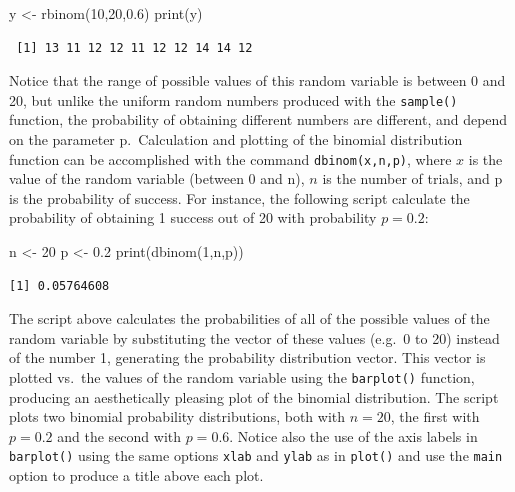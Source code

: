 \documentclass[
  letterpaper,
  DIV=11,
  numbers=noendperiod]{scrreprt}
\newenvironment{Shaded}{\begin{snugshade}}{\end{snugshade}}
\newcommand{\DecValTok}[1]{\textcolor[rgb]{0.68,0.00,0.00}{#1}}
\newcommand{\FloatTok}[1]{\textcolor[rgb]{0.68,0.00,0.00}{#1}}
\newcommand{\FunctionTok}[1]{\textcolor[rgb]{0.28,0.35,0.67}{#1}}
\newcommand{\NormalTok}[1]{\textcolor[rgb]{0.00,0.23,0.31}{#1}}
\newcommand{\OtherTok}[1]{\textcolor[rgb]{0.00,0.23,0.31}{#1}}
\begin{document}
\begin{Shaded}
\begin{Highlighting}[]
\NormalTok{y }\OtherTok{\textless{}{-}} \FunctionTok{rbinom}\NormalTok{(}\DecValTok{10}\NormalTok{,}\DecValTok{20}\NormalTok{,}\FloatTok{0.6}\NormalTok{)}
\FunctionTok{print}\NormalTok{(y)}
\end{Highlighting}
\end{Shaded}

\begin{verbatim}
 [1] 13 11 12 12 11 12 12 14 14 12
\end{verbatim}

Notice that the range of possible values of this random variable is
between 0 and 20, but unlike the uniform random numbers produced with
the \texttt{sample()} function, the probability of obtaining different
numbers are different, and depend on the parameter p.~Calculation and
plotting of the binomial distribution function can be accomplished with
the command \texttt{dbinom(x,n,p)}, where \(x\) is the value of the
random variable (between 0 and n), \(n\) is the number of trials, and p
is the probability of success. For instance, the following script
calculate the probability of obtaining 1 success out of 20 with
probability \(p=0.2\):

\begin{Shaded}
\begin{Highlighting}[]
\NormalTok{n }\OtherTok{\textless{}{-}} \DecValTok{20}
\NormalTok{p }\OtherTok{\textless{}{-}} \FloatTok{0.2}
\FunctionTok{print}\NormalTok{(}\FunctionTok{dbinom}\NormalTok{(}\DecValTok{1}\NormalTok{,n,p))}
\end{Highlighting}
\end{Shaded}

\begin{verbatim}
[1] 0.05764608
\end{verbatim}

The script above calculates the probabilities of all of the possible
values of the random variable by substituting the vector of these values
(e.g.~0 to 20) instead of the number 1, generating the probability
distribution vector. This vector is plotted vs.~the values of the random
variable using the \texttt{barplot()} function, producing an
aesthetically pleasing plot of the binomial distribution. The script
plots two binomial probability distributions, both with \(n=20\), the
first with \(p=0.2\) and the second with \(p=0.6\). Notice also the use
of the axis labels in \texttt{barplot()} using the same options
\texttt{xlab} and \texttt{ylab} as in \texttt{plot()} and use the
\texttt{main} option to produce a title above each plot.
\end{document}
